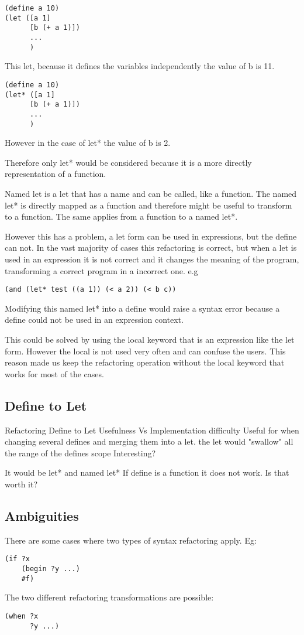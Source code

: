 \begin{lstlisting}[caption="Example"]
(define a 10)
(let ([a 1]
      [b (+ a 1)])
      ...
      )
\end{lstlisting}
This let, because it defines the variables independently the value of b is 11.

\begin{lstlisting}[caption="Example"]
(define a 10)
(let* ([a 1]
      [b (+ a 1)])
      ...
      )
\end{lstlisting}
However in the case of let* the value of b is 2.

Therefore only let* would be considered because it is a more directly
representation of a function.

Named let is a let that has a name and can be called, like a function.
The named let* is directly mapped as a function and therefore might be useful to transform to a function.
The same applies from a function to a named let*.

However this has a problem, a let form can be used in expressions, but the define can not.
In the vast majority of cases this refactoring is correct, but when a let is used in an expression
it is not correct and it changes the meaning of the program, transforming a correct
program in a incorrect one.
e.g
\begin{lstlisting}[caption="Example"]
(and (let* test ((a 1)) (< a 2)) (< b c))
\end{lstlisting}
Modifying this named let* into a define would raise a syntax error because a
define could not be used in an expression context.

This could be solved by using the local keyword that is an expression like
the let form.
However the local is not used very often and can confuse the users. This reason
made us keep the refactoring operation without the local keyword that works for
most of the cases.


\subsection{Define to Let} %
Refactoring Define to Let Usefulness Vs Implementation difficulty
Useful for when changing several defines and merging them into a let.
the let would "swallow" all the range of the defines scope
Interesting?

It would be let* and named let* If define is a function it does not work.
Is that worth it?

\subsection{Ambiguities}
There are some cases where two types of syntax refactoring apply.
Eg:
\begin{lstlisting}[caption="Example"]
(if ?x
    (begin ?y ...)
    #f)
\end{lstlisting}
The two different refactoring transformations are possible:
\begin{lstlisting}[caption="Example"]
(when ?x
      ?y ...)
\end{lstlisting}

